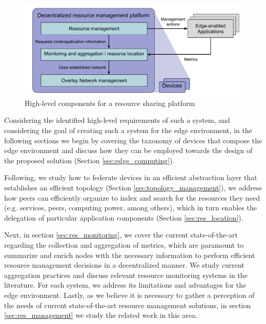 \begin{figure}
    \centering
    \includegraphics[width=0.8\linewidth]{Chapters/Figures/Resource management- generic arch.pdf}
    \caption{High-level components for a resource sharing platform}
    \label{fig:proposed_architecture}
\end{figure}


Considering the identified high-level requirements of such a system, and considering the goal of creating such a system for the edge environment, in the following sections we begin by covering the taxonomy of devices that compose the edge environment and discuss how they can be employed towards the design of the proposed solution (Section \ref{sec:edge_computing}). 

Following, we study how to federate devices in an efficient abstraction layer that establishes an efficient topology (Section \ref{sec:topology_management}), we address how peers can efficiently organize to index and search for the resources they need (e.g. services, peers, computing power, among others), which in turn enables the delegation of particular application components (Section \ref{sec:res_location}). 


Next, in section \ref{sec:res_monitoring}, we cover the current state-of-the-art regarding the collection and aggregation of metrics, which are paramount to summarize and enrich nodes with the necessary information to perform efficient resource management decisions in a decentralized manner. We study current aggregation practices and discuss relevant resource monitoring systems in the literature. For each system, we address its limitations and advantages for the edge environment. Lastly, as we believe it is necessary to gather a perception of the needs of current state-of-the-art resource management solutions, in section \ref{sec:res_management} we study the related work in this area.

